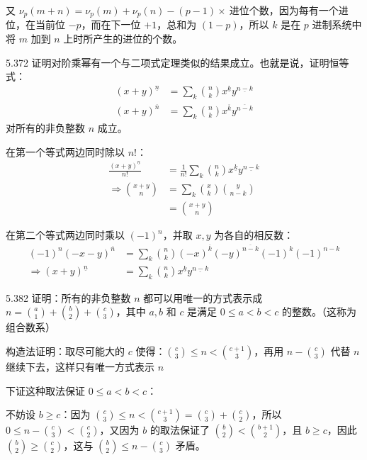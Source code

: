 又 \( \nu_p{(m+n)} = \nu_p{(m)} + \nu_p{(n)} - (p-1) \times \ \text{进位个数} \)，因为每有一个进位，在当前位 \( -p \)，而在下一位 \( +1 \)，总和为 \( (1-p) \)，所以 \( k \) 是在 \( p \) 进制系统中将 \( m \) 加到 \( n \) 上时所产生的进位的个数。

\begin{problem}{5.37}{2}
  证明对阶乘幂有一个与二项式定理类似的结果成立。也就是说，证明恒等式：
  \begin{align*}
    (x+y)^{\underline{n}} &= \sum_k \binom{n}{k} x^{\underline{k}} y^{\underline{n-k}} \\
    (x+y)^{\overline{n}} &= \sum_k \binom{n}{k} x^{\overline{k}} y^{\overline{n-k}}
  \end{align*}
  对所有的非负整数 \( n \) 成立。
\end{problem}

在第一个等式两边同时除以 \( n! \)：
\begin{align*}
  \frac{(x+y)^{\underline{n}}}{n!} &= \frac{1}{n!} \sum_k \binom{n}{k} x^{\underline{k}} y^{\underline{n-k}} \\
  \Rightarrow
  \binom{x+y}{n} &= \sum_k \binom{x}{k} \binom{y}{n-k} \\
  &= \binom{x+y}{n}
\end{align*}

在第二个等式两边同时乘以 \( (-1)^n \)，并取 \( x, y \) 为各自的相反数：
\begin{align*}
  (-1)^n (-x-y)^{\overline{n}} &=
  \sum_k \binom{n}{k} (-x)^{\overline{k}} (-y)^{\overline{n-k}} (-1)^{k} (-1)^{n-k} \\
  \Rightarrow
  (x+y)^{\underline{n}} &= \sum_k \binom{n}{k} x^{\underline{k}} y^{\underline{n-k}}
\end{align*}

\begin{problem}{5.38}{2}
  证明：所有的非负整数 \( n \) 都可以用唯一的方式表示成 \( n = \binom{a}{1} + \binom{b}{2} + \binom{c}{3} \)，其中 \( a, b \) 和 \( c \) 是满足 \( 0 \le a < b < c \) 的整数。（这称为组合数系）
\end{problem}

构造法证明：取尽可能大的 \( c \) 使得：\( \binom{c}{3} \le n < \binom{c+1}{3} \)，再用 \( n - \binom{c}{3} \) 代替 \( n \) 继续下去，这样只有唯一方式表示 \( n \)

下证这种取法保证 \( 0 \le a < b < c \)：

不妨设 \( b \ge c \)：因为 \( \binom{c}{3} \le n < \binom{c+1}{3} = \binom{c}{3} + \binom{c}{2} \)，所以 \( 0 \le n - \binom{c}{3} < \binom{c}{2} \)，又因为 \( b \) 的取法保证了 \( \binom{b}{2} < \binom{b+1}{2} \)，且 \( b \ge c \)，因此 \( \binom{b}{2} \ge \binom{c}{2} \)，这与 \( \binom{b}{2} \le n - \binom{c}{3} \) 矛盾。


